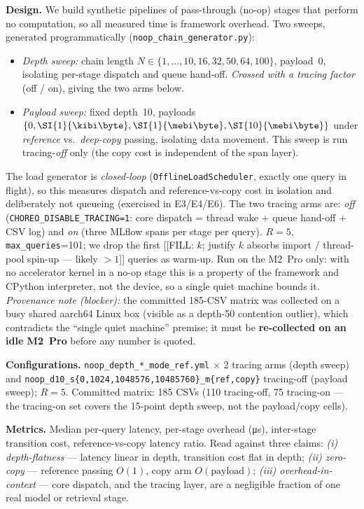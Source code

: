 \textbf{Design.} We build synthetic pipelines of pass-through (no-op)
stages that perform no computation, so all measured time is framework
overhead. Two sweeps, generated programmatically
(\texttt{noop\_chain\_generator.py}):
\begin{itemize}
  \item \emph{Depth sweep:} chain length
    $N\in\{1,\dots,10,16,32,50,64,100\}$, payload~0, isolating per-stage
    dispatch and queue hand-off. \emph{Crossed with a tracing factor}
    (off / on), giving the two arms below.
  \item \emph{Payload sweep:} fixed depth~10, payloads
    $\{0, \SI{1}{\kibi\byte}, \SI{1}{\mebi\byte}, \SI{10}{\mebi\byte}\}$
    under \emph{reference} vs.\ \emph{deep-copy} passing, isolating data
    movement. This sweep is run tracing-\emph{off} only (the copy cost is
    independent of the span layer).
\end{itemize}
The load generator is \emph{closed-loop}
(\texttt{OfflineLoadScheduler}, exactly one query in flight), so this
measures dispatch and reference-vs-copy cost in isolation and deliberately
not queueing (exercised in E3/E4/E6). The two tracing arms are: \emph{off}
(\texttt{CHOREO\_DISABLE\_TRACING=1}: core dispatch = thread wake + queue
hand-off + CSV log) and \emph{on} (three MLflow spans per stage per query).
$R{=}5$, \texttt{max\_queries}=101; we drop the first [[FILL: $k$; justify
$k$ absorbs import / thread-pool spin-up --- likely $>1$]] queries as
warm-up. Run on the M2~Pro only: with no accelerator kernel in a no-op
stage this is a property of the framework and CPython interpreter, not the
device, so a single quiet machine bounds it.
\emph{Provenance note (blocker):} the committed 185-CSV matrix was
collected on a busy shared aarch64 Linux box (visible as a depth-50
contention outlier), which contradicts the ``single quiet machine''
premise; it must be \textbf{re-collected on an idle M2~Pro} before any
number is quoted.

\textbf{Configurations.} \texttt{noop\_depth\_*\_mode\_ref.yml} $\times$
2 tracing arms (depth sweep) and
\texttt{noop\_d10\_s\{0,1024,1048576,10485760\}\_m\{ref,copy\}} tracing-off
(payload sweep); $R{=}5$. Committed matrix: 185 CSVs (110 tracing-off,
75 tracing-on --- the tracing-on set covers the 15-point depth sweep, not
the payload/copy cells).

\textbf{Metrics.} Median per-query latency, per-stage overhead
(\si{\micro\second}), inter-stage transition cost, reference-vs-copy
latency ratio. Read against three claims: \emph{(i) depth-flatness} ---
latency linear in depth, transition cost flat in depth; \emph{(ii)
zero-copy} --- reference passing $O(1)$, copy arm $O(\text{payload})$;
\emph{(iii) overhead-in-context} --- core dispatch, and the tracing layer,
are a negligible fraction of one real model or retrieval stage.

